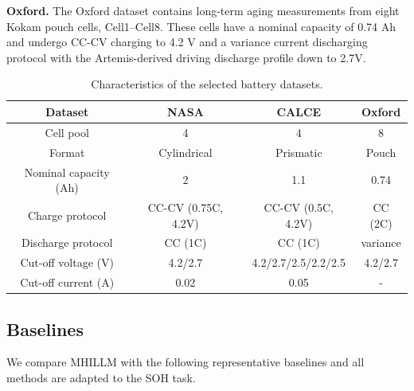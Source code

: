 \documentclass[preprint,12pt]{elsarticle}
\begin{document}
\textbf{Oxford.}  The Oxford dataset contains long-term aging measurements from eight Kokam pouch cells, Cell1--Cell8. These cells have a nominal capacity of 0.74 Ah and undergo CC-CV charging to 4.2 V and a variance current discharging protocol with the Artemis-derived driving discharge profile down to 2.7V.




\begin{table}
\centering
\caption{Characteristics of the selected battery datasets.}
\label{tab:dataset_statistics}
\setlength{\tabcolsep}{1pt}
\begin{tabular}{cccc}
\hline
Dataset & NASA & CALCE & Oxford  \\
\hline
Cell pool  & 4 & 4 & 8   \\
Format & Cylindrical  & Prismatic & Pouch   \\
Nominal capacity (Ah)  & 2 & 1.1 & 0.74   \\
Charge protocol    & CC-CV (0.75C, 4.2V)  & CC-CV (0.5C, 4.2V)  & CC (2C)\\
Discharge protocol    & CC (1C)  & CC (1C) & variance\\
Cut-off voltage (V) & 4.2/2.7  & 4.2/2.7/2.5/2.2/2.5   & 4.2/2.7 \\
Cut-off current (A) & 0.02  & 0.05   & - \\
\hline
\end{tabular}
\end{table}


\subsection{Baselines}
We compare MHILLM with the following representative baselines and all methods are adapted to the SOH task.
\end{document}
